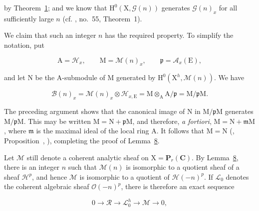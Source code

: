 by Theorem~\hyperref[gaga:thm:1]{1}; and we know that $\mathrm{H}^0(\mathrm{X},\mathcal{G}(n))$ generates $\mathcal{G}(n)_x$ for all sufficiently large $n$ (cf. , no.~55, Theorem~1).

We claim that such an integer $n$ has the required property. To simplify the notation, put

\begin{equation*}
\mathrm{A}=\mathcal{H}_x,\qquad \mathrm{M}=\mathcal{M}(n)_x,\qquad
\mathfrak{p}=\mathcal{A}_x(\mathrm{E}),
\end{equation*}

and let $\mathrm{N}$ be the $\mathrm{A}$-submodule of $\mathrm{M}$ generated by $\mathrm{H}^0(\mathrm{X}^h,\mathcal{M}(n))$. We have

\begin{equation*}
\mathcal{B}(n)_x
=\mathcal{M}(n)_x\otimes\mathcal{H}_{x,\mathrm{E}}
=\mathrm{M}\otimes_\mathrm{A} \mathrm{A}/\mathfrak{p}
=\mathrm{M}/\mathfrak{p}\mathrm{M}.
\end{equation*}

The preceding argument shows that the canonical image of $\mathrm{N}$ in $\mathrm{M}/\mathfrak{p}\mathrm{M}$ generates $\mathrm{M}/\mathfrak{p}\mathrm{M}$. This may be written $\mathrm{M}=\mathrm{N}+\mathfrak{p}\mathrm{M}$, and therefore, \emph{a fortiori}, $\mathrm{M}=\mathrm{N}+\mathfrak{m}\mathrm{M}$, where $\mathfrak{m}$ is the maximal ideal of the local ring $\mathrm{A}$. It follows that $\mathrm{M}=\mathrm{N}$ (, Proposition~, ), completing the proof of Lemma~\hyperref[gaga:lemma:8]{8}.


Let $\mathcal{M}$ still denote a coherent analytic sheaf on $\mathrm{X}=\mathbf{P}_r(\mathbf{C})$. By Lemma~\hyperref[gaga:lemma:8]{8}, there is an integer $n$ such that $\mathcal{M}(n)$ is isomorphic to a quotient sheaf of a sheaf $\mathcal{H}^p$, and hence $\mathcal{M}$ is isomorphic to a quotient of $\mathcal{H}(-n)^p$. If $\mathcal{L}_0$ denotes the coherent algebraic sheaf $\mathcal{O}(-n)^p$, there is therefore an exact sequence

\begin{equation*}
0\longrightarrow\mathcal{R}\longrightarrow\mathcal{L}_0^h
\longrightarrow\mathcal{M}\longrightarrow0,
\end{equation*}

